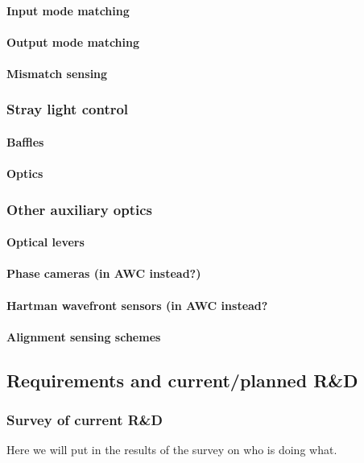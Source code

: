 \paragraph{Input mode matching}
\paragraph{Output mode matching}
\paragraph{Mismatch sensing}

\subsubsection{Stray light control}
\paragraph{Baffles}
\paragraph{Optics}

\subsubsection{Other auxiliary optics}
\paragraph{Optical levers}
\paragraph{Phase cameras (in AWC instead?)}
\paragraph{Hartman wavefront sensors (in AWC instead?}
\paragraph{Alignment sensing schemes}

\subsection{Requirements and current/planned R\&D}
\subsubsection{Survey of current R\&D}
Here we will put in the results of the survey on who is doing what.


